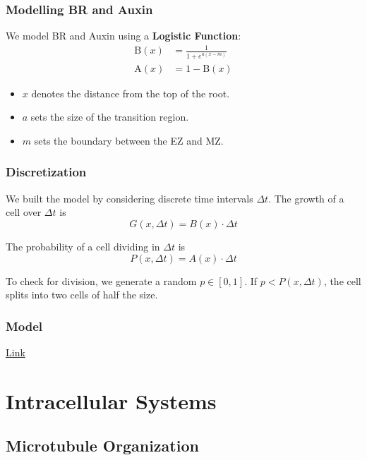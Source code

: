\documentclass{beamer}
\begin{document}
\begin{frame}
\frametitle{Modelling BR and Auxin}

We model BR and Auxin using a \textbf{Logistic Function}:
$$\begin{aligned}
	\text{B}(x) &= \frac{1}{1 + e^{a(x - m)}} \\[5pt]
	\text{A}(x) &= 1 - \text{B}(x)
\end{aligned}$$

\begin{itemize}

	\item $x$ denotes the distance from the top of the root.
	\item $a$ sets the size of the transition region.
	\item $m$ sets the boundary between the EZ and MZ.
\end{itemize}

\end{frame}

\begin{frame}
\frametitle{Discretization}

We built the model by considering discrete time intervals $\Delta t$. The growth of a cell over $\Delta t$ is 
$$G(x, \Delta t) = B(x) \cdot \Delta t  $$

The probability of a cell dividing in $\Delta t$ is
$$P(x, \Delta t) = A(x) \cdot \Delta t$$

To check for division, we generate a random $p \in [0, 1]$. If $p < P(x, \Delta t)$, the cell splits into two cells of half the size.

\bigskip


\end{frame}

\begin{frame}
\frametitle{Model}

\textcolor{blue}{\href{https://github.com/rileywheadon/plant-growth/blob/master/presentation/model1.gif}{Link}}

\end{frame}

\section{Intracellular Systems}

\subsection{Microtubule Organization}
\end{document}
